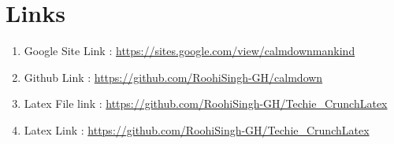 \section{Links}
\begin{enumerate}
    \item Google Site Link :
\url{https://sites.google.com/view/calmdownmankind}
\item Github Link : 
\url{https://github.com/RoohiSingh-GH/calmdown}
\item Latex File link : \url{https://github.com/RoohiSingh-GH/Techie_CrunchLatex}
\item Latex Link :
\url{https://github.com/RoohiSingh-GH/Techie_CrunchLatex}
\end{enumerate}
